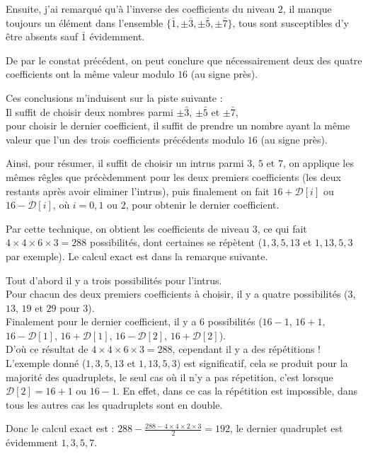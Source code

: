 \documentclass[12pt, a4paper]{memoir}
\begin{document}
  Ensuite, j'ai remarqué qu'à l'inverse des coefficients du niveau $2$, il manque toujours un élément dans 
  l'ensemble $\{\bar{1},\pm\bar{3},\pm\bar{5},\pm\bar{7}\}$, tous sont susceptibles d'y être absents sauf
  $\bar{1}$ évidemment.
  
  De par le constat précédent, on peut conclure que nécessairement deux des quatre coefficients ont la même 
  valeur modulo $16$ (au signe près).
  
  Ces conclusions m'induisent sur la piste suivante : \\
  Il suffit de choisir deux nombres parmi $\pm \bar{3}$, $\pm \bar{5}$ et $\pm \bar{7}$, \\
  pour choisir le dernier coefficient, il suffit de prendre un nombre ayant la même valeur que l'un des 
  trois coefficients précédents modulo $16$ (au signe près).
  
  Ainsi, pour résumer, il suffit de choisir un intrus parmi $3$, $5$ et $7$, on applique les mêmes rêgles
  que précèdemment pour les deux premiers coefficients (les deux restants après avoir eliminer l'intrus),
  puis finalement on fait $16 + \mathcal{D}[i]$ ou $16 - \mathcal{D}[i]$, où $i = 0, 1$ ou $2$, pour obtenir
  le dernier coefficient.
  
  Par cette technique, on obtient les coefficients de niveau $3$, ce qui fait $4 \times 4 \times 6 \times 3 = 288$
  possibilités, dont certaines se répètent ($1,3,5,13$ et $1,13,5,3$ par exemple). Le calcul exact est dans la remarque suivante.
  
  \begin{Remarque}
   Tout d'abord il y a trois possibilités pour l'intrus. \\
   Pour chacun des deux premiers coefficients à choisir, il y a quatre possibilités ($3$, $13$, $19$ et $29$
   pour $3$). \\
   Finalement pour le dernier coefficient, il y a $6$ possibilités ($16 - 1$, $16 + 1$,
   $16 - \mathcal{D}[1]$, $16 + \mathcal{D}[1]$, $16 - \mathcal{D}[2]$, $16 + \mathcal{D}[2]$). \\
   D'où ce résultat de $4 \times 4 \times 6 \times 3 = 288$, cependant il y a des répétitions ! \\
   L'exemple donné ($1,3,5,13$ et $1,13,5,3$) est significatif, cela se produit pour la majorité des
   quadruplets, le seul cas où il n'y a pas répetition, c'est lorsque $\mathcal{D}[2] = 16 + 1$ ou $16 - 1$.
   En effet, dans ce cas la répétition est impossible, dans tous les autres cas les quadruplets sont en double.
   
   Donc le calcul exact est : $288 - \frac{288 - 4 \times 4 \times 2 \times 3}{2} = 192$, le dernier quadruplet est 
   évidemment $1,3,5,7$.
  \end{Remarque}
\end{document}
